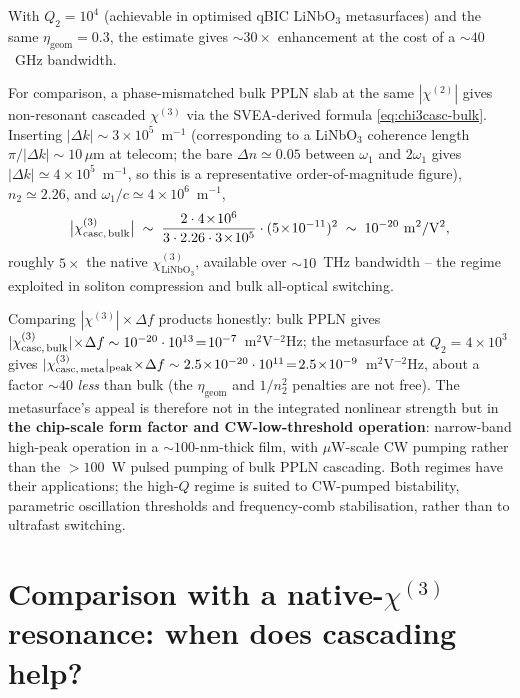 \documentclass[11pt,a4paper]{article}
\newcommand{\chitwo}{\chi^{(2)}}
\newcommand{\chithree}{\chi^{(3)}}
\begin{document}
With $Q_2=10^{4}$ (achievable in optimised qBIC LiNbO$_3$
metasurfaces) and the same $\eta_\text{geom}=0.3$, the estimate gives
$\sim 30\times$ enhancement at the cost of a $\sim 40$~GHz bandwidth.

For comparison, a phase-mismatched bulk PPLN slab at the same
$|\chitwo|$ gives non-resonant cascaded $\chithree$ via the
SVEA-derived formula \eqref{eq:chi3casc-bulk}.  Inserting
$|\Delta k|\sim 3\!\times\!10^{5}$~m$^{-1}$ (corresponding to a
LiNbO$_3$ coherence length $\pi/|\Delta k|\sim 10\,\mu$m at telecom;
the bare $\Delta n\!\simeq\!0.05$ between $\omega_1$ and $2\omega_1$
gives $|\Delta k|\!\simeq\!4\!\times\!10^{5}$~m$^{-1}$, so this is
a representative order-of-magnitude figure), $n_2\simeq 2.26$, and
$\omega_1/c\simeq 4\!\times\!10^{6}$~m$^{-1}$,
\begin{equation*}
  \bigl|\chithree_\text{casc,\,bulk}\bigr|\;\sim\;
    \frac{2\cdot 4\!\times\!10^{6}}{3\cdot 2.26\cdot 3\!\times\!10^{5}}
    \cdot (5\!\times\!10^{-11})^{2}
  \;\sim\;10^{-20}\ \mathrm{m^{2}/V^{2}},
\end{equation*}
roughly $5\times$ the native $\chithree_\mathrm{LiNbO_3}$, available
over $\sim\!10$~THz bandwidth -- the regime exploited in soliton
compression and bulk all-optical switching.

Comparing $|\chithree|\!\times\!\Delta f$ products honestly: bulk
PPLN gives $|\chithree_\text{casc,\,bulk}|\!\times\!\Delta f\sim
10^{-20}\cdot 10^{13}\!=\!10^{-7}$~m$^{2}$V$^{-2}$Hz;
the metasurface at $Q_2=4{\times}10^{3}$ gives
$|\chithree_\text{casc,\,meta}|_\text{peak}\!\times\!\Delta f\sim
2.5\!\times\!10^{-20}\cdot 10^{11}\!=\!2.5\!\times\!10^{-9}$~m$^{2}$V$^{-2}$Hz,
about a factor $\sim\!40$ \emph{less} than bulk (the $\eta_\text{geom}$
and $1/n_2^{2}$ penalties are not free).  The metasurface's appeal
is therefore not in the integrated nonlinear strength but in
\textbf{the chip-scale form factor and CW-low-threshold operation}:
narrow-band high-peak operation in a $\sim 100$-nm-thick film, with
$\mu$W-scale CW pumping rather than the $>\!100$~W pulsed pumping
of bulk PPLN cascading.  Both regimes have their applications; the
high-$Q$ regime is suited to CW-pumped bistability, parametric
oscillation thresholds and frequency-comb stabilisation, rather
than to ultrafast switching.

\section{Comparison with a native-$\chithree$ resonance: when does cascading help?}\label{sec:comparison}
\end{document}
